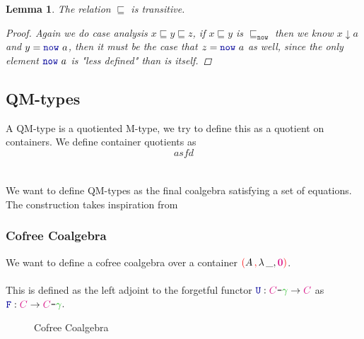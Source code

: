 \documentclass[twoside,11pt,openright]{report}
\theoremstyle{plain} %
\newtheorem{lem}[thm]{Lemma}
\theoremstyle{definition}
\theoremstyle{remark}
\newcommand*{\term}[1]{\textcolor{green!70!black}{#1}} %
\newcommand*{\type}[1]{\textcolor{magenta!90!black}{#1}}
\newcommand*{\containerpair}[2]{\textcolor{red}{(}#1\,\textcolor{red}{,}\,#2\textcolor{red}{)}}
\newcommand*{\empt}{\type{\textbf{0}}}
\newcommand*{\coalg}[2]{#1\texttt{-}#2}
\newcommand*{\function}[1]{\textcolor{blue!60!black}{\ensuremath{\mathtt{#1}}}}
\newcommand*{\functor}[1]{\ensuremath{\mathbf{\mathtt{#1}}}}
\begin{document}
\begin{lem}
  The relation \(\sqsubseteq\) is transitive.
  \begin{proof}
    Again we do case analysis \(x \sqsubseteq y \sqsubseteq z\), if \(x \sqsubseteq y\) is \(\sqsubseteq_{\mathtt{now}}\) then we know \(x \downarrow a\) and \(y = \function{now}~a\), then it must be the case that \(z = \function{now}~a\) as well, since the only element \(\function{now}~a\) is "less defined" than is itself.
  \end{proof}
\end{lem}




\subsection{QM-types}
A QM-type is a quotiented M-type, we try to define this as a quotient on containers. We define container quotients as
\begin{equation}
  asfd
\end{equation}
\\ \\
We want to define QM-types as the final coalgebra satisfying a set of equations. The construction takes inspiration from \cite{Infinitary-QIITs}
\subsubsection{Cofree Coalgebra}
We want to define a cofree coalgebra over a container \(\containerpair{A}{\lambda\,\_, \empt}\).
\\ \\
This is defined as the left adjoint to the forgetful functor \(\function{U} : \coalg{\type{C}}{\term{\gamma}} \rightarrow \type{C}\) as \(\function{F} : \type{C} \rightarrow \coalg{\type{C}}{\term{\gamma}}\).

\begin{figure}[h]
  \centering
  \caption{Cofree Coalgebra}
  \label{fig:cofree-coalgebra}
\end{figure}
\end{document}
